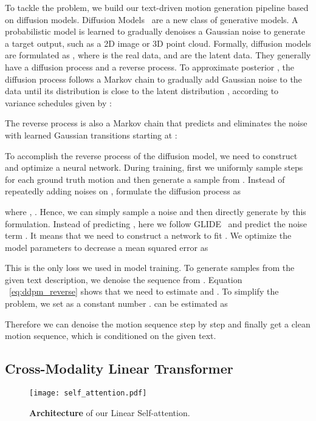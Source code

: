 To tackle the problem, we build our text-driven motion generation pipeline based on diffusion models. Diffusion Models~\citep{ho2020denoising,dhariwal2021diffusion,nichol2021improved,nichol2021glide} are a new class of generative models.  
A probabilistic model is learned to gradually denoises a Gaussian noise to generate a target output, such as a 2D image or 3D point cloud.
Formally, diffusion models are formulated as , where  is the real data, and  are the latent data.
They generally have a diffusion process and a reverse process.
To approximate posterior , the diffusion process follows a Markov chain to gradually add Gaussian noise to the data until its distribution is close to the latent distribution , according to variance schedules given by :


The reverse process  is also a Markov chain that predicts and eliminates the noise with learned Gaussian transitions starting at :


To accomplish the reverse process of the diffusion model, we need to construct and optimize a neural network. During training, first we uniformly sample steps  for each ground truth motion  and then generate a sample from 
. Instead of repeatedly adding noises on , \cite{ho2020denoising} formulate the diffusion process as

where , . Hence, we can simply sample a noise  and then directly generate  by this formulation. Instead of predicting , here we follow GLIDE~\citep{nichol2021glide} and predict the noise term . It means that we need to construct a network to fit . We optimize the model parameters to decrease a mean squared error as

This is the only loss we used in model training. To generate samples from the given text description, we denoise the sequence from . Equation ~\ref{eq:ddpm_reverse} shows that we need to estimate  and . To simplify the problem, we set  as a constant number .  can be estimated as

Therefore we can denoise the motion sequence step by step and finally get a clean motion sequence, which is conditioned on the given text.

\subsection{Cross-Modality Linear Transformer}\label{sec3_4}

\begin{figure}[t]
    \centering
    \texttt{[image: self\_attention.pdf]}
    \caption{\textbf{Architecture} of our Linear Self-attention.}
    \label{fig:arch}
\end{figure}

